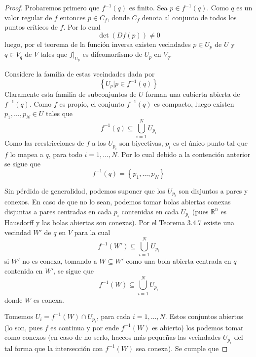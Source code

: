 \documentclass[12pt]{report}
\theoremstyle{largebreak}
\begin{document}
\begin{proof}
    Probaremos primero que $f^{-1}(q)$ es finito. Sea $p\in f^{-1}(q)$. Como $q$ es un valor regular de $f$ entonces $p\in C_f$, donde $C_f$ denota al conjunto de todos los puntos críticos de $f$. Por lo cual
    \begin{equation*}
        \det(Df(p))\neq0
    \end{equation*}
    luego, por el teorema de la función inversa existen vecindades $p\in U_p$ de $U$ y $q\in V_q$ de $V$ tales que $f|_{U_p}$ es difeomorfismo de $U_p$ en $V_q$.

    Considere la familia de estas vecindades dada por
    \begin{equation*}
        \left\{U_p|p\in f^{-1}(q)\right\}
    \end{equation*}
    Claramente esta familia de subconjuntos de $U$ forman una cubierta abierta de $f^{-1}(q)$. Como $f$ es propio, el conjunto $f^{-1}(q)$ es compacto, luego existen $p_1,\dots,p_N\in U$ tales que
    \begin{equation*}
        f^{-1}(q)\subseteq\bigcup_{i=1}^{N}U_{p_i}
    \end{equation*}
    Como las reestricciones de $f$ a los $U_{p_i}$ son biyectivas, $p_i$ es el único punto tal que $f$ lo mapea a $q$, para todo $i=1,\dots,N$. Por lo cual debido a la contención anterior se sigue que
    \begin{equation*}
        f^{-1}(q)=\left\{p_1,\dots,p_N\right\}
    \end{equation*}
    
    Sin pérdida de generalidad, podemos suponer que los $U_{p_i}$ son disjuntos a pares y conexos. En caso de que no lo sean, podemos tomar bolas abiertas conexas disjuntas a pares centradas en cada $p_i$ contenidas en cada $U_{p_i}$ (pues $\mathbb{R}^n$ es Hausdorff y las bolas abiertas son conexas). Por el Teorema 3.4.7 existe una vecindad $W'$ de $q$ en $V$ para la cual
    \begin{equation*}
        f^{-1}(W')\subseteq\bigcup_{i=1}^{N}U_{p_i}
    \end{equation*}
    si $W'$ no es conexa, tomando a $W\subseteq W'$ como una bola abierta centrada en $q$ contenida en $W'$, se sigue que
    \begin{equation*}
        f^{-1}(W)\subseteq\bigcup_{i=1}^{N}U_{p_i}
    \end{equation*}
    donde $W$ es conexa.

    Tomemos $U_i=f^{-1}(W)\cap U_{p_i}$, para cada $i=1,\dots,N$. Estos conjuntos abiertos (lo son, pues $f$ es continua y por ende $f^{-1}(W)$ es abierto) los podemos tomar como conexos (en caso de no serlo, haceos más pequeñas las vecindades $U_{p_i}$ del tal forma que la intersección con $f^{-1}(W)$ sea conexa). Se cumple que


\end{proof}
\end{document}
